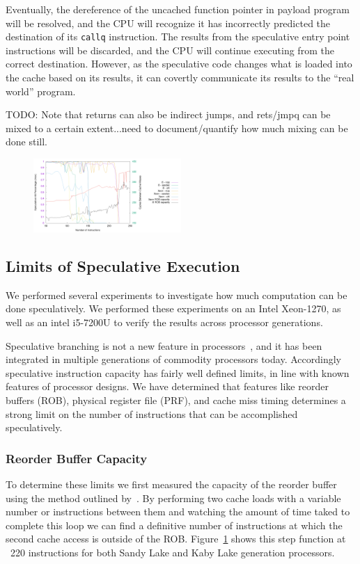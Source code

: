 Eventually, the dereference of the uncached function pointer in payload program
will be resolved, and the CPU will recognize it has incorrectly predicted the
destination of its \texttt{callq} instruction. The results from the speculative
entry point instructions will be discarded, and the CPU will continue executing
from the correct destination. However, as the speculative code changes what is
loaded into the cache based on its results, it can covertly communicate its
results to the ``real world'' program.


TODO: Note that returns can also be indirect jumps, and rets/jmpq can be mixed
to a certain extent...need to document/quantify how much mixing can be done
still.


\begin{figure}[t]
    \centering
        \includegraphics[width=0.5\textwidth]{figures/Speculative_capacity.png}
    \caption{}
    \label{fig:spec-capacity}
\end{figure}

\subsection{Limits of Speculative Execution}
We performed several experiments to investigate how much computation can be done
speculatively. We performed these experiments on an Intel Xeon-1270, as well as 
an intel i5-7200U to verify the results across processor generations. 

Speculative branching is not a new feature in processors~\cite{branching-hist}, 
and it has been integrated in multiple generations of commodity processors today. 
Accordingly speculative instruction capacity has fairly well defined limits, in 
line with known features of processor designs. We have determined that features 
like reorder buffers (ROB), physical register file (PRF), and cache miss timing
determines a strong limit on the number of instructions that can be accomplished
speculatively. 

\subsubsection{Reorder Buffer Capacity} \label{sssec:ROB}
To determine these limits we first measured the capacity of the reorder buffer
using the method outlined by~\cite{intel-rob-capacity}. By performing two cache loads
with a variable number or instructions between them and watching the amount of 
time taked to complete this loop we can find a definitive number of instructions
at which the second cache access is outside of the ROB. Figure~\ref{fig:spec-capacity}
shows this step function at ~220 instructions for both Sandy Lake and Kaby Lake 
generation processors. 

